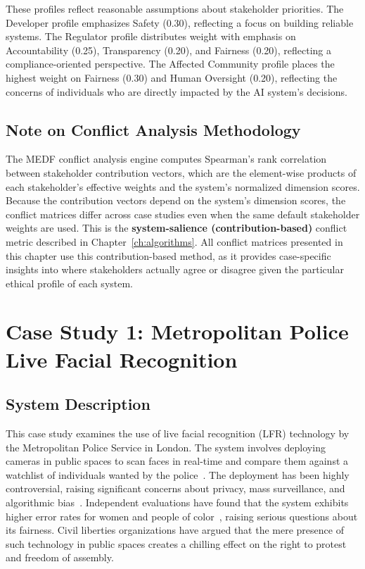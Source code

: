 These profiles reflect reasonable assumptions about stakeholder priorities. The Developer profile emphasizes Safety (0.30), reflecting a focus on building reliable systems. The Regulator profile distributes weight with emphasis on Accountability (0.25), Transparency (0.20), and Fairness (0.20), reflecting a compliance-oriented perspective. The Affected Community profile places the highest weight on Fairness (0.30) and Human Oversight (0.20), reflecting the concerns of individuals who are directly impacted by the AI system's decisions.

\subsection{Note on Conflict Analysis Methodology}
\label{sec:conflict_note}

The MEDF conflict analysis engine computes Spearman's rank correlation between stakeholder contribution vectors, which are the element-wise products of each stakeholder's effective weights and the system's normalized dimension scores. Because the contribution vectors depend on the system's dimension scores, the conflict matrices differ across case studies even when the same default stakeholder weights are used. This is the \textbf{system-salience (contribution-based)} conflict metric described in Chapter~\ref{ch:algorithms}. All conflict matrices presented in this chapter use this contribution-based method, as it provides case-specific insights into where stakeholders actually agree or disagree given the particular ethical profile of each system.

\section{Case Study 1: Metropolitan Police Live Facial Recognition}
\label{sec:cs1}

\subsection{System Description}

This case study examines the use of live facial recognition (LFR) technology by the Metropolitan Police Service in London. The system involves deploying cameras in public spaces to scan faces in real-time and compare them against a watchlist of individuals wanted by the police~\cite{metpolice2023lfr}. The deployment has been highly controversial, raising significant concerns about privacy, mass surveillance, and algorithmic bias~\cite{ico2021lfr}. Independent evaluations have found that the system exhibits higher error rates for women and people of color~\cite{buolamwini2018gender}, raising serious questions about its fairness. Civil liberties organizations have argued that the mere presence of such technology in public spaces creates a chilling effect on the right to protest and freedom of assembly.

